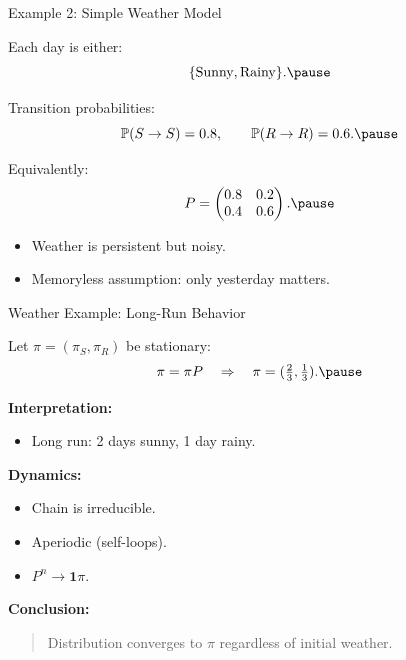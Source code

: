 \documentclass[aspectratio=169]{beamer}
\begin{document}
\begin{frame}{Example 2: Simple Weather Model}

Each day is either:
\[
\{\text{Sunny}, \text{Rainy}\}.\pause
\]

Transition probabilities:
\[
\mathbb{P}(S\to S)=0.8,
\qquad
\mathbb{P}(R\to R)=0.6.\pause
\]

\medskip
Equivalently:
\[
P=
\begin{pmatrix}
0.8 & 0.2\\
0.4 & 0.6
\end{pmatrix}.\pause
\]

\begin{itemize}
  \item Weather is persistent but noisy.\pause
  \item Memoryless assumption: only yesterday matters.
\end{itemize}

\end{frame}


\begin{frame}{Weather Example: Long-Run Behavior}

Let $\pi=(\pi_S,\pi_R)$ be stationary:
\[
\pi=\pi P
\quad \Rightarrow \quad
\pi=(\tfrac23,\tfrac13).\pause
\]

\medskip
\textbf{Interpretation:}
\begin{itemize}
  \item Long run: 2 days sunny, 1 day rainy.\pause
\end{itemize}

\medskip
\textbf{Dynamics:}
\begin{itemize}
  \item Chain is irreducible.\pause
  \item Aperiodic (self-loops).\pause
  \item $P^n \to \mathbf{1}\pi$.\pause
\end{itemize}

\medskip
\textbf{Conclusion:}
\begin{quote}
Distribution converges to $\pi$ regardless of initial weather.
\end{quote}

\end{frame}
\end{document}
